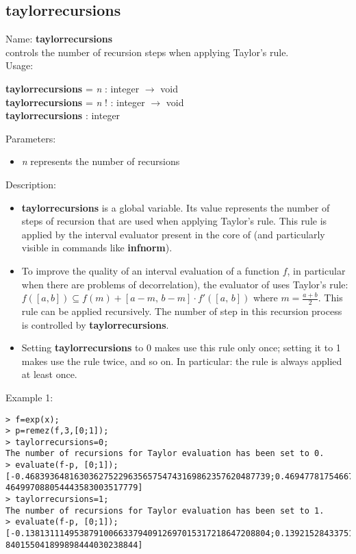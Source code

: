 \subsection{taylorrecursions}
\label{labtaylorrecursions}
\noindent Name: \textbf{taylorrecursions}\\
controls the number of recursion steps when applying Taylor's rule.\\
\noindent Usage: 
\begin{center}
\textbf{taylorrecursions} = \emph{n} : \textsf{integer} $\rightarrow$ \textsf{void}\\
\textbf{taylorrecursions} = \emph{n} ! : \textsf{integer} $\rightarrow$ \textsf{void}\\
\textbf{taylorrecursions} : \textsf{integer}\\
\end{center}
Parameters: 
\begin{itemize}
\item \emph{n} represents the number of recursions
\end{itemize}
\noindent Description: \begin{itemize}

\item \textbf{taylorrecursions} is a global variable. Its value represents the number of steps
   of recursion that are used when applying Taylor's rule. This rule is applied
   by the interval evaluator present in the core of \sollya (and particularly
   visible in commands like \textbf{infnorm}).

\item To improve the quality of an interval evaluation of a function $f$, in 
   particular when there are problems of decorrelation), the evaluator of \sollya
   uses Taylor's rule:  $f([a,b]) \subseteq f(m) + [a-m,\,b-m] \cdot f'([a,\,b])$ where $m=\frac{a+b}{2}$.
   This rule can be applied recursively.
   The number of step in this recursion process is controlled by \textbf{taylorrecursions}.

\item Setting \textbf{taylorrecursions} to 0 makes \sollya use this rule only once;
   setting it to 1 makes \sollya use the rule twice, and so on.
   In particular: the rule is always applied at least once.
\end{itemize}
\noindent Example 1: 
\begin{center}\begin{minipage}{15cm}\begin{Verbatim}[frame=single]
> f=exp(x);
> p=remez(f,3,[0;1]);
> taylorrecursions=0;
The number of recursions for Taylor evaluation has been set to 0.
> evaluate(f-p, [0;1]);
[-0.46839364816303627522963565754743169862357620487739;0.46947781754667086491682
464997088054443583003517779]
> taylorrecursions=1;
The number of recursions for Taylor evaluation has been set to 1.
> evaluate(f-p, [0;1]);
[-0.13813111495387910066337940912697015317218647208804;0.13921528433751369035056
840155041899898444030238844]
\end{Verbatim}
\end{minipage}\end{center}
